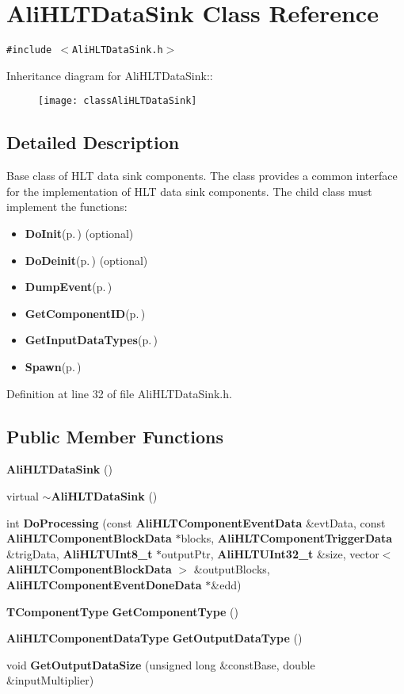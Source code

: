 \section{Ali\-HLTData\-Sink Class Reference}
\label{classAliHLTDataSink}
{\tt \#include $<$Ali\-HLTData\-Sink.h$>$}

Inheritance diagram for Ali\-HLTData\-Sink::\begin{figure}[H]
\begin{center}
\leavevmode
\texttt{[image: classAliHLTDataSink]}
\end{center}
\end{figure}


\subsection{Detailed Description}
Base class of HLT data sink components. The class provides a common interface for the implementation of HLT data sink components. The child class must implement the functions:\begin{itemize}
\item {\bf Do\-Init}{\rm (p.\,\pageref{classAliHLTComponent_b5})} (optional)\item {\bf Do\-Deinit}{\rm (p.\,\pageref{classAliHLTComponent_b6})} (optional)\item {\bf Dump\-Event}{\rm (p.\,\pageref{classAliHLTDataSink_d0})}\item {\bf Get\-Component\-ID}{\rm (p.\,\pageref{classAliHLTComponent_a9})}\item {\bf Get\-Input\-Data\-Types}{\rm (p.\,\pageref{classAliHLTComponent_a10})}\item {\bf Spawn}{\rm (p.\,\pageref{classAliHLTComponent_a13})} \end{itemize}




Definition at line 32 of file Ali\-HLTData\-Sink.h.\subsection*{Public Member Functions}
\begin{CompactItemize}
\item 
{\bf Ali\-HLTData\-Sink} ()
\item 
virtual {\bf $\sim$Ali\-HLTData\-Sink} ()
\item 
int {\bf Do\-Processing} (const {\bf Ali\-HLTComponent\-Event\-Data} \&evt\-Data, const {\bf Ali\-HLTComponent\-Block\-Data} $\ast$blocks, {\bf Ali\-HLTComponent\-Trigger\-Data} \&trig\-Data, {\bf Ali\-HLTUInt8\_\-t} $\ast$output\-Ptr, {\bf Ali\-HLTUInt32\_\-t} \&size, vector$<$ {\bf Ali\-HLTComponent\-Block\-Data} $>$ \&output\-Blocks, {\bf Ali\-HLTComponent\-Event\-Done\-Data} $\ast$\&edd)
\item 
{\bf TComponent\-Type} {\bf Get\-Component\-Type} ()
\item 
{\bf Ali\-HLTComponent\-Data\-Type} {\bf Get\-Output\-Data\-Type} ()
\item 
void {\bf Get\-Output\-Data\-Size} (unsigned long \&const\-Base, double \&input\-Multiplier)
\end{CompactItemize}
